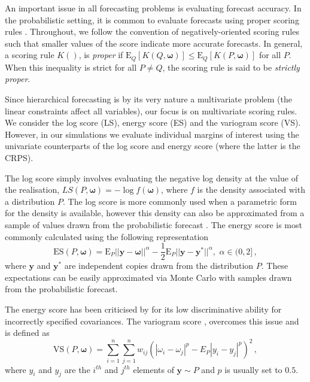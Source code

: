\documentclass[12pt]{article}
\def\E{\text{E}}
\theoremstyle{definition}
\begin{document}
An important issue in all forecasting problems is evaluating forecast accuracy. In the probabilistic setting, it is common to evaluate forecasts using proper scoring rules \citep[see][and references therein]{Gneiting2007,Gneiting2014}. Throughout, we follow the convention of negatively-oriented scoring rules such that smaller values of the score indicate more accurate forecasts.  In general, a scoring rule $K()$, is {\em proper} if $\E_{Q}[K(Q,\bm{\omega})] \le \E_{Q}[K(P,{\bm\omega})]$ for all $P$. When this inequality is strict for all $P\neq Q$, the scoring rule is said to be {\em strictly proper}.

Since hierarchical forecasting is by its very nature a multivariate problem (the linear constraints affect all variables), our focus is on multivariate scoring rules.  We consider the log score (LS), energy score (ES) and the variogram score (VS).  However, in our simulations we evaluate individual margins of interest using the univariate counterparts of the log score and energy score (where the latter is the CRPS).

The log score simply involves evaluating the negative log density at the value of the realisation, $LS(P,\bm\omega)=-\log f(\bm\omega)$, where $f$ is the density associated with a distribution $P$.  The log score is more commonly used when a parametric form for the density is available, however  this density can also be approximated from a sample of values drawn from the probabilistic forecast \citep[see][]{Jordan2017}.  The energy score is most commonly calculated using the following representation
\begin{equation*}\label{eq:Energy_score}
\text{ES}(P,\bm{\omega}) =
\E_{P}
||{\bm{y}}-\bm{\omega}||^\alpha -\frac{1}{2}\E_{P}||\bm{y}-\bm{y}^*||^\alpha, \,\, \alpha \in (0,2]\,,
\end{equation*}
where $\bm {y}$ and $\bm{y^*}$ are independent copies drawn from the distribution $P$.  These expectations can be easily approximated via Monte Carlo with samples drawn from the probabilistic forecast.  

The energy score has been criticised by \citet{Pinson2013a} for its low discriminative ability for incorrectly specified covariances.  The variogram score  \citep{SCHEUERER2015}, overcomes this issue and is defined as
\begin{equation*}
\text{VS}({P}, \bm{\omega}) = \displaystyle\sum_{i=1}^{n}\displaystyle\sum_{j=1}^{n}w_{ij}\left(|\omega_{i} - \omega_{j}|^p - E_{P} |{y}_{i}-{y}_{j}|^p\right)^2\,,
\end{equation*}
where $y_i$ and $y_j$ are the $i^{th}$ and $j^{th}$ elements of $\bm{y}\sim P$ and $p$ is usually set to $0.5$.
\end{document}
